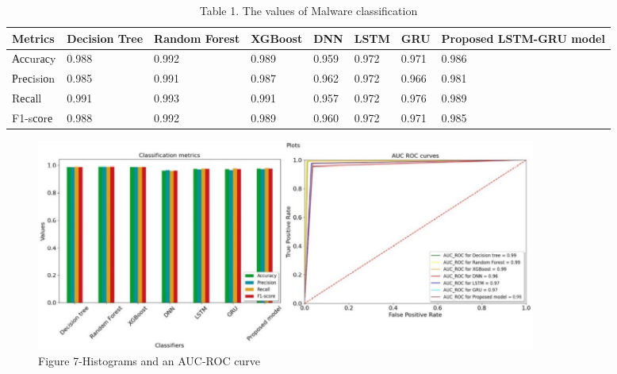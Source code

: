 \begin{table}[H]
\caption*{Table 1. The values of Malware classification}
\centering
\begin{tabular}{|l|l|l|l|l|l|l|l|}
\hline
Metrics   & Decision Tree & Random Forest & XGBoost & DNN   & LSTM  & GRU   & \multirow{1}{2cm}{Proposed LSTM-GRU model} \\ \hline
Ассurасy  & 0.988         & 0.992         & 0.989   & 0.959 & 0.972 & 0.971 & 0.986                   \\ \hline
Рrесisiоn & 0.985         & 0.991         & 0.987   & 0.962 & 0.972 & 0.966 & 0.981                   \\ \hline
Rесаll    & 0.991         & 0.993         & 0.991   & 0.957 & 0.972 & 0.976 & 0.989                   \\ \hline
F1-sсоrе  & 0.988         & 0.992         & 0.989   & 0.960 & 0.972 & 0.971 & 0.985                   \\ \hline
\end{tabular}
\end{table}

\begin{figure}[H]
	\centering
	\includegraphics[width=0.8\textwidth]{media/ict/image85}
	\caption*{Figure 7-Histograms and an AUC-ROC curve}
\end{figure}

